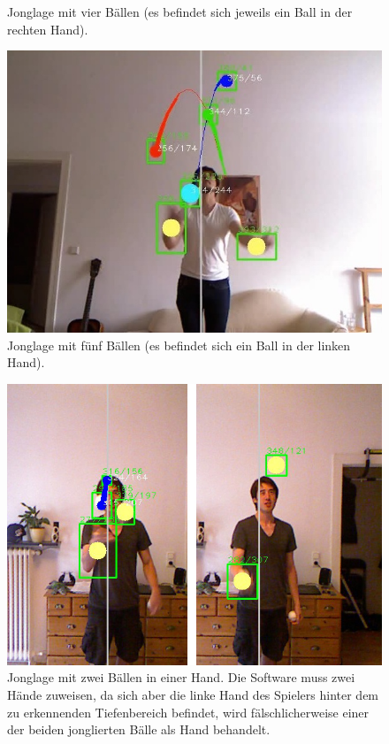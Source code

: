 \documentclass[12pt,a4paper,ngerman]{scrartcl}
\begin{document}
\begin{itemize}
\begin{figure}[H]
    \caption{Jonglage mit vier Bällen (es befindet sich jeweils ein Ball in der rechten Hand).}
\end{figure}
\begin{figure}[H]
    \centering
    \includegraphics[scale=0.5]{img/bewertung_fuenf.jpg}
    \caption{Jonglage mit fünf Bällen (es befindet sich ein Ball in der linken Hand).}
\end{figure}
\begin{figure}[H]
    \centering
    \includegraphics[scale=0.5]{img/bewertung_zwei.jpg}
    \caption{Jonglage mit zwei Bällen in einer Hand. Die Software muss zwei Hände zuweisen, da sich aber die linke Hand des Spielers hinter dem zu erkennenden Tiefenbereich befindet, wird fälschlicherweise einer der beiden jonglierten Bälle als Hand behandelt.}

\end{figure}
\end{itemize}
\end{document}
